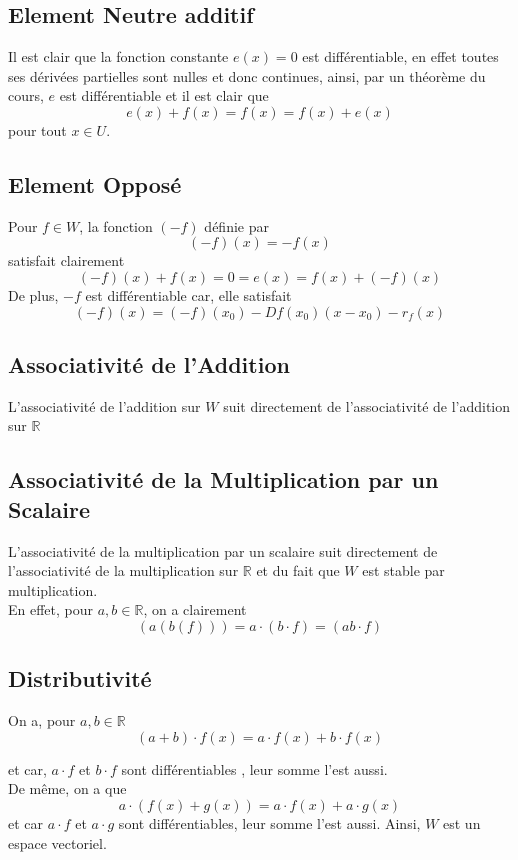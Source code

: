 \documentclass[11pt, a4paper]{article}
\begin{document}
\subsection*{Element Neutre additif}

Il est clair que la fonction constante $e( x) = 0$ est différentiable, en effet toutes ses dérivées partielles sont nulles et donc continues, ainsi, par un théorème du cours, $e$ est différentiable et il est clair que
\[ 
	e( x) + f( x) = f( x) = f( x) + e( x) 
\]
pour tout $x \in U$.
\subsection*{Element Opposé}
Pour $f \in W$, la fonction $( -f )$  définie par
\[ 
	( -f) ( x) = - f( x) 
\]
satisfait clairement
\[ 
	( -f) ( x) + f( x) = 0 = e( x)  = f( x) + ( -f) ( x) 
\]
De plus, $-f$ est différentiable car, elle satisfait
\[ 
	( -f) ( x) = ( -f) ( x_0) - Df( x_0) ( x-x_{0}) - r_f( x)
\]


\subsection*{Associativité de l'Addition }
L'associativité  de l'addition sur $W$ suit directement de l'associativité de l'addition sur $ \mathbb{R}$
\subsection*{Associativité de la Multiplication par un Scalaire}
L'associativité de la multiplication par un scalaire suit directement de l'associativité de la multiplication sur $\mathbb{R}$ et du fait que  $W$ est stable par multiplication.\\
En effet, pour $a,b \in \mathbb{R}$, on a clairement
\[ 
	( a  (  b   ( f) ) )= a \cdot ( b\cdot f) = ( ab \cdot f) 
\]
\subsection*{Distributivité}
On a, pour $a,b \in \mathbb{R}$
\[ 
	( a+b) \cdot f( x) = a \cdot f( x) + b \cdot f( x) 
\]

et car, $a \cdot f$ et $b \cdot f$ sont différentiables , leur somme l'est aussi.\\
De même, on a que
\[ 
	a \cdot ( f( x) + g( x) ) = a\cdot f( x) + a\cdot g( x) 
\]
et car $a \cdot f$ et $a\cdot g$ sont différentiables, leur somme l'est aussi.
Ainsi, $W$ est un espace vectoriel.
\end{document}
